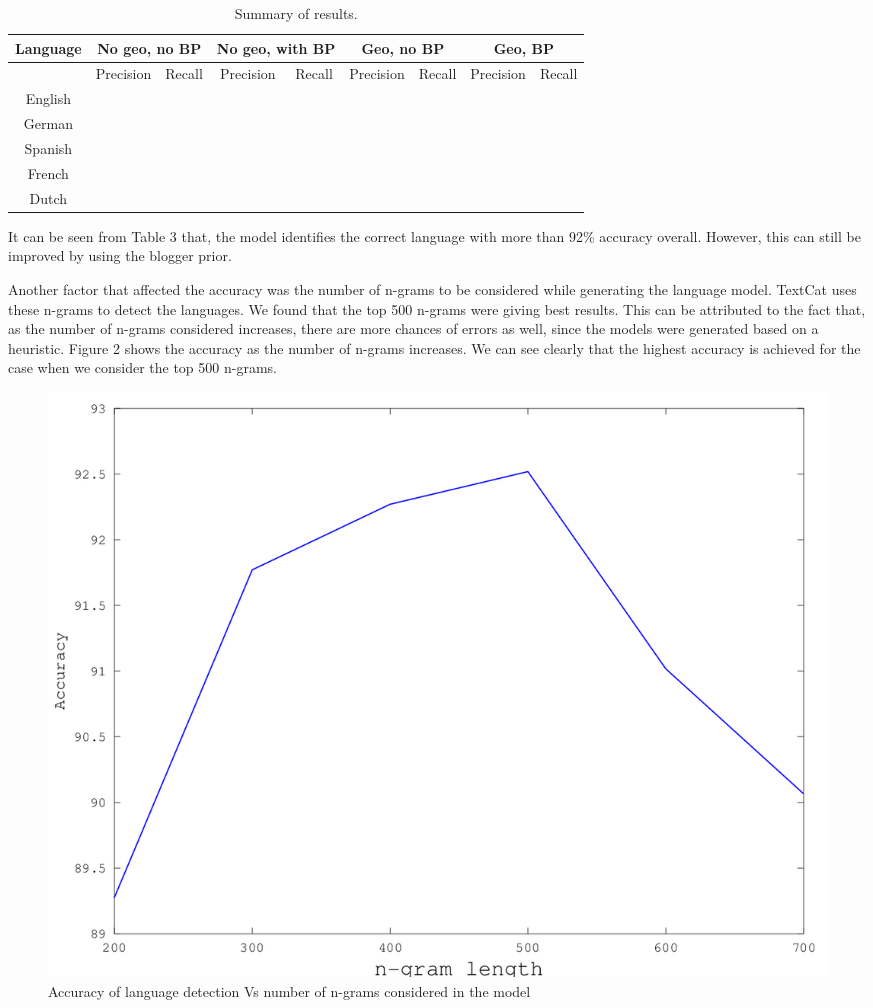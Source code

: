 \documentclass[11pt]{article}
\begin{document}
\begin{table}
\begin{center}
\small
\begin{tabular}{|c||c|c||c|c||c|c||c|c|}
\hline
\textbf{Language} & \multicolumn{2}{|c||}{\textbf {No geo, no BP}} & \multicolumn{2}{|c||}{\textbf{No geo, with BP}} & \multicolumn{2}{|c||}{\textbf{Geo, no BP}} & \multicolumn{2}{|c|}{\textbf{Geo, BP}} \\
\hline
 & Precision & Recall & Precision & Recall & Precision & Recall & Precision & Recall \\
\hline
English & & & & & & & & \\
German & & & & & & & & \\
Spanish & & & & & & & & \\
French & & & & & & & & \\
Dutch & & & & & & & & \\
\hline

\hline
\end{tabular}
\caption{\footnotesize Summary of results.}
\end{center}
\end{table}


It can be seen from Table 3 that, the model identifies the correct language with more than 92\% accuracy overall. However, this can still be improved by using the blogger prior.

Another factor that affected the accuracy was the number of n-grams to be considered while generating the language model. TextCat uses these n-grams to detect the languages. We found that the top 500 n-grams were giving best results. This can be attributed to the fact that, as the number of n-grams considered increases, there are more chances of errors as well, since the models were generated based on a heuristic. Figure 2 shows the accuracy as the number of n-grams increases. We can see clearly that the highest accuracy is achieved for the case when we consider the top 500 n-grams.

\begin{figure}[ht]
\includegraphics[scale=0.35]{ngramVsAccuracy.png}
\caption{\footnotesize Accuracy of language detection Vs number of n-grams considered in the model}
\label{fig:s3}
\end{figure}
\end{document}
